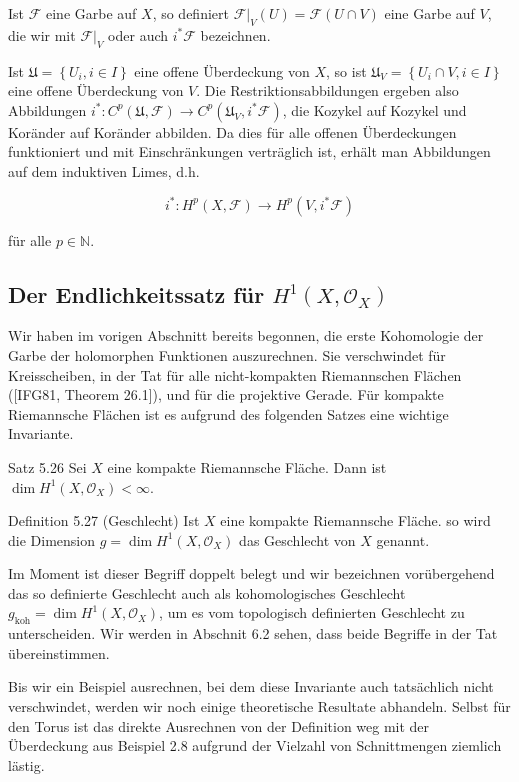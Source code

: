 \documentclass[10pt, letterpaper]{article}
\begin{document}
Ist $\mathcal{F}$ eine Garbe auf $X$, so definiert $\left.\mathcal{F}\right|_{V}(U)=\mathcal{F}(U \cap V)$ eine Garbe auf $V$, die wir mit $\left.\mathcal{F}\right|_{V}$ oder auch $i^{*} \mathcal{F}$ bezeichnen.

Ist $\mathfrak{U}=\left\{U_{i}, i \in I\right\}$ eine offene Überdeckung von $X$, so ist $\mathfrak{U}_{V}=\left\{U_{i} \cap V, i \in I\right\}$ eine offene Überdeckung von $V$. Die Restriktionsabbildungen ergeben also Abbildungen $i^{*}: C^{p}(\mathfrak{U}, \mathcal{F}) \rightarrow C^{p}\left(\mathfrak{U}_{V}, i^{*} \mathcal{F}\right)$, die Kozykel auf Kozykel und Koränder auf Koränder abbilden. Da dies für alle offenen Überdeckungen funktioniert und mit Einschränkungen verträglich ist, erhält man Abbildungen auf dem induktiven Limes, d.h.

$$
i^{*}: H^{p}(X, \mathcal{F}) \rightarrow H^{p}\left(V, i^{*} \mathcal{F}\right)
$$

für alle $p \in \mathbb{N}$.

\subsection {Der Endlichkeitssatz für $H^{1}\left(X, \mathcal{O}_{X}\right)$}
Wir haben im vorigen Abschnitt bereits begonnen, die erste Kohomologie der Garbe der holomorphen Funktionen auszurechnen. Sie verschwindet für Kreisscheiben, in der Tat für alle nicht-kompakten Riemannschen Flächen ([IFG81, Theorem 26.1]), und für die projektive Gerade. Für kompakte Riemannsche Flächen ist es aufgrund des folgenden Satzes eine wichtige Invariante.

Satz 5.26 Sei $X$ eine kompakte Riemannsche Fläche. Dann ist $\operatorname{dim} H^{1}\left(X, \mathcal{O}_{X}\right)< \infty$.

Definition 5.27 (Geschlecht) Ist $X$ eine kompakte Riemannsche Fläche. so wird die Dimension $g=\operatorname{dim} H^{1}\left(X, \mathcal{O}_{X}\right)$ das Geschlecht von $X$ genannt.

Im Moment ist dieser Begriff doppelt belegt und wir bezeichnen vorübergehend das so definierte Geschlecht auch als kohomologisches Geschlecht $g_{\mathrm{koh}}= \operatorname{dim} H^{1}\left(X, \mathcal{O}_{X}\right)$, um es vom topologisch definierten Geschlecht zu unterscheiden. Wir werden in Abschnit 6.2 sehen, dass beide Begriffe in der Tat übereinstimmen.

Bis wir ein Beispiel ausrechnen, bei dem diese Invariante auch tatsächlich nicht verschwindet, werden wir noch einige theoretische Resultate abhandeln. Selbst für den Torus ist das direkte Ausrechnen von der Definition weg mit der Überdeckung aus Beispiel 2.8 aufgrund der Vielzahl von Schnittmengen ziemlich lästig.
\end{document}
